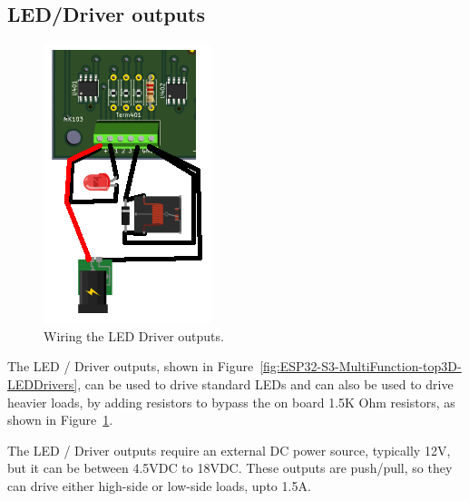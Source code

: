 \subsection{LED/Driver outputs}
\begin{figure}[hbpt]\begin{centering}%
\includegraphics{ESP32-S3-MultiFunctionLEDDriverWiring.png}
\caption{Wiring the LED Driver outputs.}
\label{fig:ESP32-S3-MultiFunctionLEDDriverWiring}
\end{centering}\end{figure}

The LED / Driver outputs, shown in 
Figure~\ref{fig:ESP32-S3-MultiFunction-top3D-LEDDrivers}, can be used to drive 
standard LEDs and can also be used to drive heavier loads, by adding resistors 
to bypass the on board 1.5K Ohm resistors, as shown in 
Figure~\ref{fig:ESP32-S3-MultiFunctionLEDDriverWiring}.

The LED / Driver outputs require an external DC power source, typically 12V,
but it can be between 4.5VDC to 18VDC. These outputs are push/pull, so they
can drive either high-side or low-side loads, upto 1.5A.

